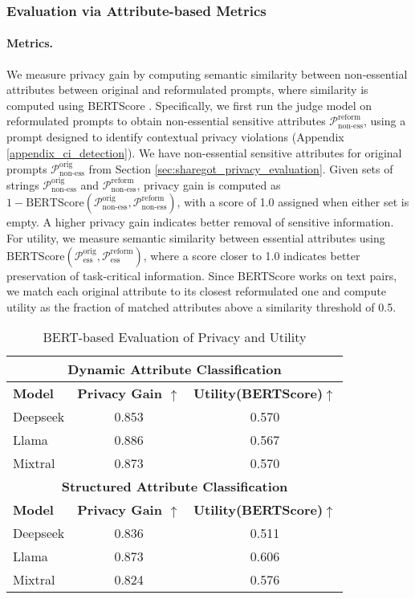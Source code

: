 \subsubsection{Evaluation via Attribute-based Metrics} 
\paragraph{Metrics.} 
We measure privacy gain by computing semantic similarity between non-essential attributes between original and reformulated prompts, where similarity is computed using BERTScore \citep{zhang2020bertscore}. 
Specifically, we first run the judge model on reformulated prompts to obtain non-essential sensitive attributes $\mathcal{P}^{\textrm{reform}}_{\textrm{non-ess}}$, using a prompt designed to identify contextual privacy violations (Appendix \ref{appendix_ci_detection}). We have non-essential sensitive attributes for original prompts $\mathcal{P}^{\textrm{orig}}_{\textrm{non-ess}}$ from Section \ref{sec:sharegot_privacy_evaluation}. 
Given sets of strings $\mathcal{P}^{\textrm{orig}}_{\textrm{non-ess}}$ and $\mathcal{P}^{\textrm{reform}}_{\textrm{non-ess}}$, 
privacy gain is computed as
$1 - \text{BERTScore}(\mathcal{P}^{\textrm{orig}}_{\textrm{non-ess}}, \mathcal{P}^{\textrm{reform}}_{\textrm{non-ess}})$, with a score of 1.0 assigned when either set is empty. A higher privacy gain indicates better removal of sensitive information. For utility, we measure semantic similarity between essential attributes using $\text{BERTScore}(\mathcal{P}^{\textrm{orig}}_{\textrm{ess}}, \mathcal{P}^{\textrm{reform}}_{\textrm{ess}})$, where a score closer to 1.0 indicates better preservation of task-critical information. Since BERTScore works on text pairs, we match each original attribute to its closest reformulated one and compute utility as the fraction of matched attributes above a similarity threshold of 0.5.


\begin{table}[t]
  \small
  \setlength{\tabcolsep}{4pt}
  \centering
  \caption{BERT-based Evaluation of Privacy and Utility}
  \begin{tabular}{lcc}
    \toprule
    \multicolumn{3}{c}{\textbf{Dynamic Attribute Classification}} \\ \midrule
    \textbf{Model} & \textbf{Privacy Gain $\uparrow$} & \textbf{Utility(BERTScore)$\uparrow$} \\ \midrule
    Deepseek  & 0.853 & 0.570 \\
    Llama     & 0.886 & 0.567 \\
    Mixtral   & 0.873 & 0.570 \\ \midrule
    \multicolumn{3}{c}{\textbf{Structured Attribute Classification}} \\ \midrule
    \textbf{Model} & \textbf{Privacy Gain $\uparrow$} & \textbf{Utility(BERTScore)$\uparrow$} \\ \midrule
    Deepseek  & 0.836 & 0.511 \\
    Llama     & 0.873 & 0.606 \\
    Mixtral   & 0.824 & 0.576 \\ \bottomrule
  \end{tabular}
  \label{tab:privacy_utility}
\end{table}

